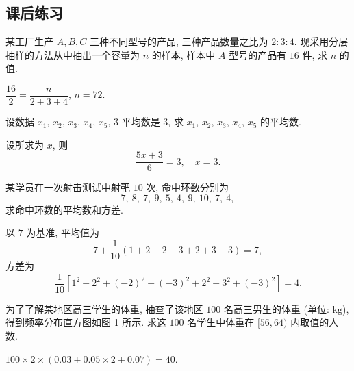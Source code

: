 \subsection{课后练习}
\begin{exercise}
    某工厂生产 $A,B,C$ 三种不同型号的产品, 三种产品数量之比为 $2:3:4$. 现采用分层抽样的方法从中抽出一个容量为 $n$ 的样本, 样本中 $A$ 型号的产品有 $16$ 件, 求 $n$ 的值.
\end{exercise}
\beginsolution
    $\dfrac{16}{2}= \dfrac{n}{2+3+4}$, $n=72$.
\endsolution

\begin{exercise}
    设数据 $x_1$, $x_2$, $x_3$, $x_4$, $x_5$, $3$ 平均数是 $3$, 求 $x_1$, $x_2$, $x_3$, $x_4$, $x_5$ 的平均数.
\end{exercise}
\beginsolution
    设所求为 $x$, 则
    \[\frac{5x+3}{6}= 3,\quad x=3.\]
\endsolution

\begin{exercise}
    某学员在一次射击测试中射靶 $10$ 次, 命中环数分别为 
    \[7,\ 8,\ 7,\ 9,\ 5,\ 4,\ 9,\ 10,\ 7,\ 4,\]
    求命中环数的平均数和方差.
\end{exercise}
\beginsolution
    以 $7$ 为基准, 平均值为
    \[7+ \frac{1}{10}(1+2-2-3+2+3-3)= 7,\]
    方差为
    \[\frac{1}{10}[1^2+2^2+(-2)^2+(-3)^2+
    2^2+3^2+(-3)^2]= 4.\]
\endsolution

\begin{exercise}
    为了了解某地区高三学生的体重, 抽查了该地区 $100$ 名高三男生的体重 (单位: $\text{kg}$), 得到频率分布直方图如图 \ref{fig-190629-1720} 所示. 求这 $100$ 名学生中体重在 $[56, 64)$ 内取值的人数.
    \begin{figure}[htb]
        \small\centering
       \caption{}\label{fig-190629-1720}
    \end{figure}   
\end{exercise}
\beginsolution
    $100\times 2\times (0.03+0.05\times 2+ 0.07)= 40$.
\endsolution

